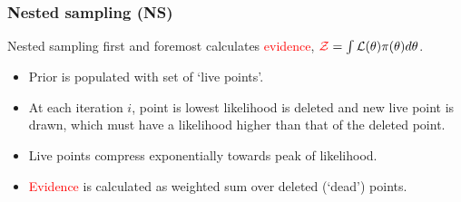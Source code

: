 \documentclass[aspectratio=169, 11pt]{beamer}
\begin{document}
\begin{frame}
\frametitle{Nested sampling (NS)}\vfill
Nested sampling first and foremost calculates \textcolor{red}{evidence}, $\textcolor{red}{\mathcal{Z}} = \int \mathcal{L(\theta)} \pi(\theta) d\theta$.
\begin{minipage}[]{0.35\textwidth}
\vspace{20em}
\vspace{-5em}
\end{minipage}\hfill
\begin{minipage}{0.5\textwidth}
    \begin{itemize}
        \item<1-> Prior is populated with set of `live points'.
        \item<2-> At each iteration $i$, point is lowest likelihood is deleted and new live point is drawn, which must have a likelihood higher than that of the deleted point.
        \item<4-> Live points compress exponentially towards peak of likelihood.
        \item<5-> \textcolor{red}{Evidence} is calculated as weighted sum over deleted (`dead') points.
    \end{itemize}
\end{minipage}
\end{frame}
\end{document}
